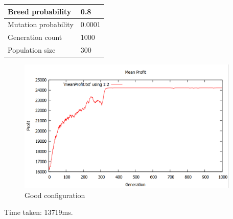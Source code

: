 \documentclass[fontsize=12pt,toc=bibliography, notitlepage]{scrreprt}
\begin{document}
\begin{tabular}{ |l|l| }
	\hline
	Breed probability & 0.8 \\ \hline
	Mutation probability & 0.0001 \\ \hline
	Generation count & 1000 \\ \hline
	Population size & 300 \\ \hline
\end{tabular}
\begin{figure}[H]
	\centering
	\includegraphics[width=400px]{images/good-config.png}
	\caption{Good configuration}
	\label{fig:good-config}
\end{figure}
Time taken: 13719ms.
\end{document}
